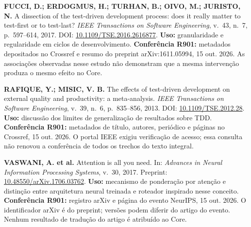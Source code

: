 \begin{referencia}
\textbf{FUCCI, D.; ERDOGMUS, H.; TURHAN, B.; OIVO, M.; JURISTO, N.}
A dissection of the test-driven development process: does it really matter to
test-first or to test-last? \emph{IEEE Transactions on Software Engineering},
v.~43, n.~7, p.~597--614, 2017.
DOI: \href{https://doi.org/10.1109/TSE.2016.2616877}{10.1109/TSE.2016.2616877}.
\textbf{Uso:} granularidade e regularidade em ciclos de desenvolvimento.
\textbf{Conferência R901:} metadados depositados no Crossref e resumo do preprint
arXiv:1611.05994, 15 out. 2026. As associações observadas nesse estudo não demonstram
que a mesma intervenção produza o mesmo efeito no Core.
\end{referencia}

\begin{referencia}
\textbf{RAFIQUE, Y.; MISIC, V. B.} The effects of test-driven development on
external quality and productivity: a meta-analysis. \emph{IEEE Transactions on
Software Engineering}, v.~39, n.~6, p.~835--856, 2013.
DOI: \href{https://doi.org/10.1109/TSE.2012.28}{10.1109/TSE.2012.28}.
\textbf{Uso:} discussão dos limites de generalização de resultados sobre TDD.
\textbf{Conferência R901:} metadados de título, autores, periódico e páginas
no Crossref, 15 out. 2026. O portal IEEE exigiu verificação de acesso; essa
consulta não renovou a conferência de todos os trechos do texto integral.
\end{referencia}

\begin{referencia}
\textbf{VASWANI, A. et al.} Attention is all you need. In: \emph{Advances in Neural
Information Processing Systems}, v.~30, 2017. Preprint:
\href{https://doi.org/10.48550/arXiv.1706.03762}{10.48550/arXiv.1706.03762}.
\textbf{Uso:} mecanismo de ponderação por atenção e distinção entre arquitetura
neural treinada e roteador inspirado nesse conceito.
\textbf{Conferência R901:} registro arXiv e página do evento NeurIPS, 15 out. 2026.
O identificador arXiv é do preprint; versões podem diferir do artigo do evento.
Nenhum resultado de tradução do artigo é atribuído ao Core.
\end{referencia}

